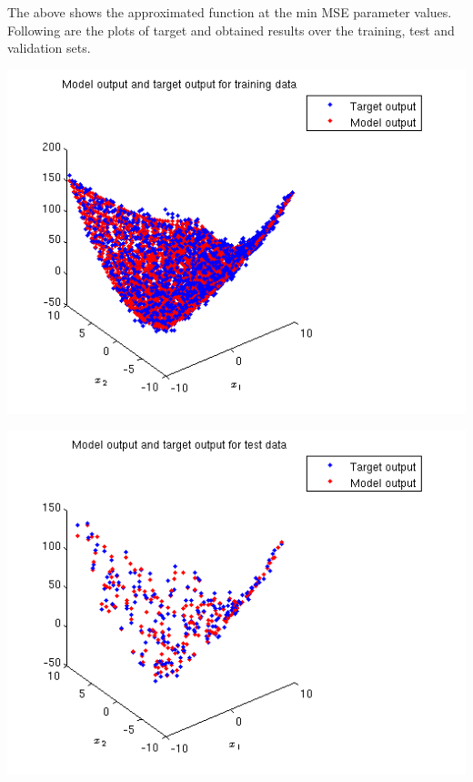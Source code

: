 \documentclass{article}
\begin{document}
The above shows the approximated function at the min MSE parameter values.
\\[10pt]
Following are the plots of target and obtained results over the training, test and validation sets.
\begin{center}
\includegraphics[scale=.6]{Regression/bivar/eps/plot_train}
\end{center}
\begin{center}
\includegraphics[scale=.6]{Regression/bivar/eps/plot_test}
\end{center}
\end{document}
